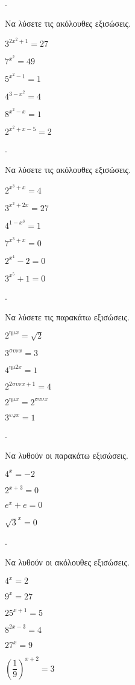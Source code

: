 \documentclass[11pt,a4paper,twocolumn]{article}
\newcommand{\hm}[1]{\textrm{ημ}#1}
\newcommand{\syn}[1]{\textrm{συν}#1}
\newcommand{\ef}[1]{\textrm{εφ}#1}
\newcounter{askhsh}
\newcommand{\askhsh}{\large\theaskhsh.\ \addtocounter{askhsh}{1}}
\begin{document}
\askhsh Να λύσετε τις ακόλουθες εξισώσεις.
\begin{multicols}{2}
\begin{alist}
\item $3^{2x^2+1}=27$
\item $7^{x^2}=49$
\item $5^{x^2-1}=1$
\item $4^{3-x^2}=4$
\item $8^{x^2-x}=1$
\item $2^{x^2+x-5}=2$
\end{alist}
\end{multicols}

\askhsh Να λύσετε τις ακόλουθες εξισώσεις.
\begin{multicols}{2}
\begin{alist}
\item $2^{x^3+x}=4$
\item $3^{x^2+2x}=27$
\item $4^{1-x^3}=1$
\item $7^{x^3+x}=0$
\item $2^{x^4}-2=0$
\item $3^{x^5}+1=0$
\end{alist}
\end{multicols}
\askhsh Να λύσετε τις παρακάτω εξισώσεις.
\begin{multicols}{2}
\begin{alist}
\item $2^{\hm{x}}=\sqrt{2}$
\item $3^{\syn{x}}=3$
\item $4^{\hm{2x}}=1$
\item $2^{2\syn{x}+1}=4$
\item $2^{\hm{x}}=2^{\syn{x}}$
\item $3^{\ef{x}}=1$
\end{alist}
\end{multicols}
\askhsh Να λυθούν οι παρακάτω εξισώσεις.
\begin{multicols}{2}
\begin{alist}
\item $4^{x}=-2$
\item $2^{x+3}=0$
\item $e^x+e=0$
\item $\sqrt{3}^x=0$
\end{alist}
\end{multicols}
\askhsh Να λυθούν οι ακόλουθες εξισώσεις.
\begin{multicols}{2}
\begin{alist}
\item $4^x=2$
\item $9^x=27$
\item $25^{x+1}=5$
\item $8^{2x-3}=4$
\item $27^x=9$
\item $\left(\dfrac{1}{9}\right)^{x+2}=3$
\end{alist}
\end{multicols}
\end{document}
